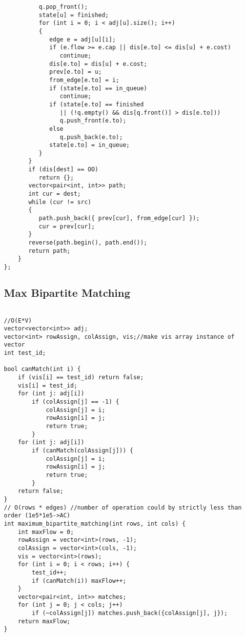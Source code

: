 \documentclass{article}
\begin{document}
\begin{verbatim}
          q.pop_front();  
          state[u] = finished;  
          for (int i = 0; i < adj[u].size(); i++)  
          {  
             edge e = adj[u][i];  
             if (e.flow >= e.cap || dis[e.to] <= dis[u] + e.cost)  
                continue;  
             dis[e.to] = dis[u] + e.cost;  
             prev[e.to] = u;  
             from_edge[e.to] = i;  
             if (state[e.to] == in_queue)  
                continue;  
             if (state[e.to] == finished  
                || (!q.empty() && dis[q.front()] > dis[e.to]))  
                q.push_front(e.to);  
             else  
                q.push_back(e.to);  
             state[e.to] = in_queue;  
          }  
       }  
       if (dis[dest] == OO)  
          return {};  
       vector<pair<int, int>> path;  
       int cur = dest;  
       while (cur != src)  
       {  
          path.push_back({ prev[cur], from_edge[cur] });  
          cur = prev[cur];  
       }  
       reverse(path.begin(), path.end());  
       return path;  
    }  
};
\end{verbatim}

\subsection{Max Bipartite Matching}
\begin{verbatim}
  
//O(E*V)  
vector<vector<int>> adj;  
vector<int> rowAssign, colAssign, vis;//make vis array instance of vector  
int test_id;  
  
bool canMatch(int i) {  
    if (vis[i] == test_id) return false;  
    vis[i] = test_id;  
    for (int j: adj[i])  
        if (colAssign[j] == -1) {  
            colAssign[j] = i;  
            rowAssign[i] = j;  
            return true;  
        }  
    for (int j: adj[i])  
        if (canMatch(colAssign[j])) {  
            colAssign[j] = i;  
            rowAssign[i] = j;  
            return true;  
        }  
    return false;  
}  
// O(rows * edges) //number of operation could by strictly less than order (1e5*1e5->AC)  
int maximum_bipartite_matching(int rows, int cols) {  
    int maxFlow = 0;  
    rowAssign = vector<int>(rows, -1);  
    colAssign = vector<int>(cols, -1);  
    vis = vector<int>(rows);  
    for (int i = 0; i < rows; i++) {  
        test_id++;  
        if (canMatch(i)) maxFlow++;  
    }  
    vector<pair<int, int>> matches;  
    for (int j = 0; j < cols; j++)  
        if (~colAssign[j]) matches.push_back({colAssign[j], j});  
    return maxFlow;  
}
\end{verbatim}
\end{document}
